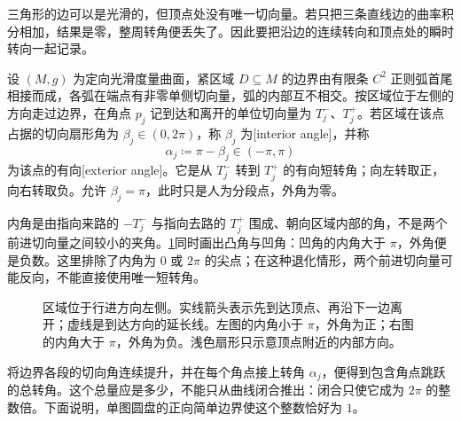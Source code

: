 三角形的边可以是光滑的，但顶点处没有唯一切向量。若只把三条直线边的曲率积分相加，结果是零，整周转角便丢失了。因此要把沿边的连续转向和顶点处的瞬时转向一起记录。

\begin{definition}
	\label{g1:def:boundary-exterior-angle}
	设 \((M,g)\) 为定向光滑度量曲面，紧区域 \(D\subseteq M\) 的边界由有限条 \(C^2\) 正则弧首尾相接而成，各弧在端点有非零单侧切向量，弧的内部互不相交。按区域位于左侧的方向走过边界，在角点 \(p_j\) 记到达和离开的单位切向量为 \(T_j^-\)、\(T_j^+\)。若区域在该点占据的切向扇形角为 \(\beta_j\in(0,2\pi)\)，称 \(\beta_j\) 为[interior angle]，并称
	\[
		\alpha_j\coloneqq\pi-\beta_j\in(-\pi,\pi)
	\]
	为该点的有向[exterior angle]。它是从 \(T_j^-\) 转到 \(T_j^+\) 的有向短转角；向左转取正，向右转取负。允许 \(\beta_j=\pi\)，此时只是人为分段点，外角为零。
\end{definition}

内角是由指向来路的 \(-T_j^-\) 与指向去路的 \(T_j^+\) 围成、朝向区域内部的角，不是两个前进切向量之间较小的夹角。\cref{g1:fig:boundary-exterior-angles}同时画出凸角与凹角：凹角的内角大于 \(\pi\)，外角便是负数。这里排除了内角为 \(0\) 或 \(2\pi\) 的尖点；在这种退化情形，两个前进切向量可能反向，不能直接使用唯一短转角。

\begin{figure}[htbp]
	\centering
	
	\caption[边界外角的符号]{区域位于行进方向左侧。实线箭头表示先到达顶点、再沿下一边离开；虚线是到达方向的延长线。左图的内角小于 \(\pi\)，外角为正；右图的内角大于 \(\pi\)，外角为负。浅色扇形只示意顶点附近的内部方向。}
	\label{g1:fig:boundary-exterior-angles}
\end{figure}

将边界各段的切向角连续提升，并在每个角点接上转角 \(\alpha_j\)，便得到包含角点跳跃的总转角。这个总量应是多少，不能只从曲线闭合推出：闭合只使它成为 \(2\pi\) 的整数倍。下面说明，单图圆盘的正向简单边界使这个整数恰好为 \(1\)。

